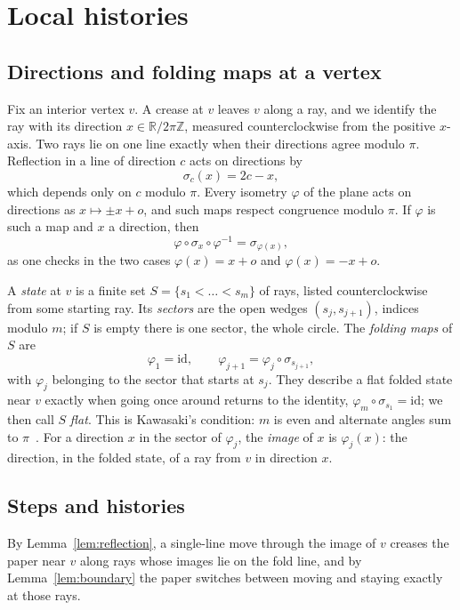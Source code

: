 \documentclass[11pt]{article}
\theoremstyle{definition}
\theoremstyle{remark}
\newcommand{\R}{\mathbb{R}}
\newcommand{\Z}{\mathbb{Z}}
\newcommand{\Dir}{\R/2\pi\Z}
\begin{document}
\section{Local histories}\label{sec:local}

\subsection{Directions and folding maps at a vertex}

Fix an interior vertex $v$. A crease at $v$ leaves $v$ along a ray, and we identify the ray with its direction $x\in\Dir$, measured counterclockwise from the positive $x$-axis. Two rays lie on one line exactly when their directions agree modulo $\pi$. Reflection in a line of direction $c$ acts on directions by
\[
\sigma_c(x)=2c-x,
\]
which depends only on $c$ modulo $\pi$. Every isometry $\varphi$ of the plane acts on directions as $x\mapsto \pm x+o$, and such maps respect congruence modulo $\pi$. If $\varphi$ is such a map and $x$ a direction, then
\begin{equation}\label{eq:conj}
\varphi\circ\sigma_x\circ\varphi^{-1}=\sigma_{\varphi(x)},
\end{equation}
as one checks in the two cases $\varphi(x)=x+o$ and $\varphi(x)=-x+o$.

A \emph{state} at $v$ is a finite set $S=\{s_1<\dots<s_m\}$ of rays, listed counterclockwise from some starting ray. Its \emph{sectors} are the open wedges $(s_j,s_{j+1})$, indices modulo $m$; if $S$ is empty there is one sector, the whole circle. The \emph{folding maps} of $S$ are
\[
\varphi_1=\mathrm{id},\qquad \varphi_{j+1}=\varphi_j\circ\sigma_{s_{j+1}},
\]
with $\varphi_j$ belonging to the sector that starts at $s_j$. They describe a flat folded state near $v$ exactly when going once around returns to the identity, $\varphi_m\circ\sigma_{s_1}=\mathrm{id}$; we then call $S$ \emph{flat}. This is Kawasaki's condition: $m$ is even and alternate angles sum to $\pi$~\cite{hull}. For a direction $x$ in the sector of $\varphi_j$, the \emph{image} of $x$ is $\varphi_j(x)$: the direction, in the folded state, of a ray from $v$ in direction $x$.

\subsection{Steps and histories}

By Lemma~\ref{lem:reflection}, a single-line move through the image of $v$ creases the paper near $v$ along rays whose images lie on the fold line, and by Lemma~\ref{lem:boundary} the paper switches between moving and staying exactly at those rays.
\end{document}
